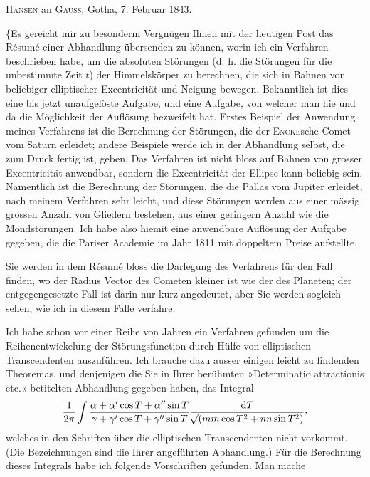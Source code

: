 \par{}\bigskip
\begin{center}
\textsc{Hansen} an \textsc{Gauss}, Gotha, 7. Februar 1843.
\end{center}
\noindent\hspace*{\parindent}\{Es gereicht mir zu besonderm Vergnügen Ihnen mit der heutigen Post das Résumé einer Abhandlung übersenden zu können, worin ich ein Verfahren beschrieben habe, um die absoluten Störungen (d. h. die Störungen für die unbestimmte Zeit \(t\)) der Himmelskörper zu berechnen, die sich in Bahnen von beliebiger elliptischer Excentricität und Neigung bewegen. Bekanntlich ist dies eine bis jetzt unaufgelöste Aufgabe, und eine Aufgabe, von welcher man hie und da die Möglichkeit der Auflösung bezweifelt hat. Erstes Beispiel der Anwendung meines Verfahrens ist die Berechnung der Störungen, die der \textsc{Encke}sche Comet vom Saturn erleidet; andere Beispiele werde ich in der Abhandlung selbst, die zum Druck fertig ist, geben. Das Verfahren ist nicht bloss auf Bahnen von grosser Excentricität anwendbar, sondern die Excentricität der Ellipse kann beliebig sein. Namentlich ist die Berechnung der Störungen, die die Pallas vom Jupiter erleidet, nach meinem Verfahren sehr leicht, und diese Störungen werden aus einer mässig grossen Anzahl von Gliedern bestehen, aus einer geringern Anzahl wie die Mondstörungen. Ich habe also hiemit eine anwendbare Auflösung der Aufgabe gegeben, die die Pariser Academie im Jahr 1811 mit doppeltem Preise aufstellte.
\par{}Sie werden in dem Résumé bloss die Darlegung des Verfahrens für den Fall finden, wo der Radius Vector des Cometen kleiner ist wie der des Planeten; der entgegengesetzte Fall ist darin nur kurz angedeutet, aber Sie werden sogleich sehen, wie ich in diesem Falle verfahre.
\par Ich habe schon vor einer Reihe von Jahren ein Verfahren gefunden um die Reihenentwickelung der Störungsfunction durch Hülfe von elliptischen Transcendenten auszuführen. Ich brauche dazu ausser einigen leicht zu findenden Theoremas, und denjenigen die Sie in Ihrer berühmten »Determinatio attractionis etc.« betitelten Abhandlung gegeben haben, das Integral
\[
\frac{1}{2\pi}\int\frac{\alpha+\alpha'\cos T+\alpha''\sin T}{\gamma+\gamma'\cos T+\gamma''\sin T}\frac{\mathrm{d}T}{\BareRoot{(mm\cos T^2+nn\sin T^2)}}\mathpunct{\raisebox{.45ex}{,}}
\]
welches in den Schriften über die elliptischen Transcendenten nicht vorkommt. (Die Bezeichnungen sind die Ihrer angeführten Abhandlung.) Für die Berechnung dieses Integrals habe ich folgende Vorschriften gefunden. Man mache
